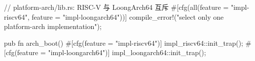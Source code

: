 \begin{rustcode}
// platform-arch/lib.rs: RISC-V 与 LoongArch64 互斥
#[cfg(all(feature = "impl-riscv64", feature = "impl-loongarch64"))]
compile_error!("select only one platform-arch implementation");

pub fn arch_boot() {
    #[cfg(feature = "impl-riscv64")]
    impl_riscv64::init_trap();
    #[cfg(feature = "impl-loongarch64")]
    impl_loongarch64::init_trap();
}
\end{rustcode}
